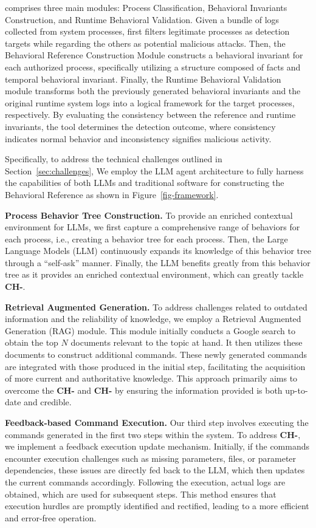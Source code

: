 \tool comprises three main modules: Process Classification, Behavioral Invariants Construction, and Runtime Behavioral Validation. Given a bundle of logs collected from system processes, \tool first filters legitimate processes as detection targets while regarding the others as potential malicious attacks. Then, the Behavioral Reference Construction Module constructs a behavioral invariant for each authorized process, specifically utilizing a structure composed of facts and temporal behavioral invariant. Finally, the Runtime Behavioral Validation module transforms both the previously generated behavioral invariants and the original runtime system logs into a logical framework for the target processes, respectively. By evaluating the consistency between the reference and runtime invariants, the tool determines the detection outcome, where consistency indicates normal behavior and inconsistency signifies malicious activity.

Specifically, to address the technical challenges outlined in Section~\ref{sec:challenges}, We employ the LLM agent architecture to fully harness the capabilities of both LLMs and traditional software for constructing the Behavioral Reference as shown in Figure~\ref{fig-framework}.


\noindent
{\bf Process Behavior Tree Construction.} To provide an enriched contextual environment for LLMs, we first capture a comprehensive range of behaviors for each process, i.e., creating a behavior tree for each process. Then, the Large Language Models (LLM) continuously expands its knowledge of this behavior tree through a ``self-ask'' manner. Finally, the LLM benefits greatly from this behavior tree as it provides an enriched contextual environment, which can greatly tackle {\bf CH-}.

\noindent
{\bf Retrieval Augmented Generation.} 
To address challenges related to outdated information and the reliability of knowledge, we employ a Retrieval Augmented Generation (RAG) module. This module initially conducts a Google search to obtain the top $N$ documents relevant to the topic at hand. It then utilizes these documents to construct additional commands. These newly generated commands are integrated with those produced in the initial step, facilitating the acquisition of more current and authoritative knowledge. This approach primarily aims to overcome the {\bf CH-} and {\bf CH-} by ensuring the information provided is both up-to-date and credible.


\noindent
{\bf Feedback-based Command Execution.} 
Our third step involves executing the commands generated in the first two steps within the system. To address {\bf CH-}, we implement a feedback execution update mechanism. Initially, if the commands encounter execution challenges such as missing parameters, files, or parameter dependencies, these issues are directly fed back to the LLM, which then updates the current commands accordingly. Following the execution, actual logs are obtained, which are used for subsequent steps. This method ensures that execution hurdles are promptly identified and rectified, leading to a more efficient and error-free operation.

